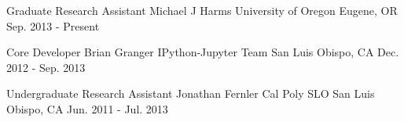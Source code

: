 
\begin{cvresearching}
  \cvresearch
    {Graduate Research Assistant} %
    {Michael J Harms}
    {University of Oregon} %
    {Eugene, OR} %
    {Sep. 2013 - Present} %

  \cvresearch
    {Core Developer} %
    {Brian Granger}
    {IPython-Jupyter Team} %
    {San Luis Obispo, CA} %
    {Dec. 2012 - Sep. 2013} %

  \cvresearch
    {Undergraduate Research Assistant} %
    {Jonathan Fernler}
    {Cal Poly SLO} %
    {San Luis Obispo, CA} %
    {Jun. 2011 - Jul. 2013} %

\end{cvresearching}
